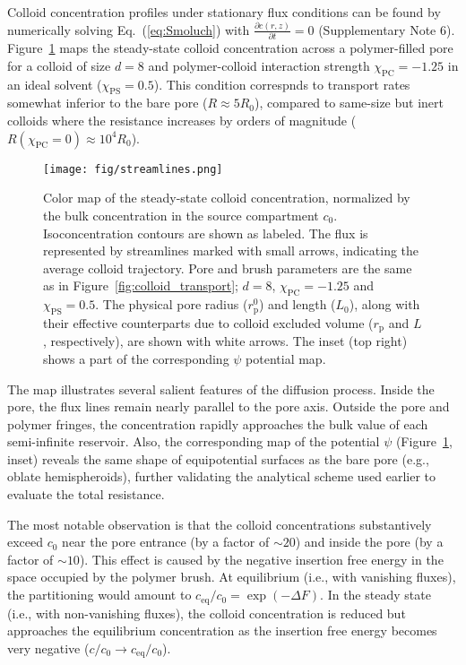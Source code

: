 \documentclass[12pt, a4paper]{article}
\begin{document}
Colloid concentration profiles under stationary flux conditions can be found by numerically solving Eq.~(\ref{eq:Smoluch}) with $\frac{\partial c(r,z)}{\partial t} = 0$ (Supplementary Note 6).
Figure~\ref{fig:colloid_concentration} maps the steady-state colloid concentration across a polymer-filled pore for a colloid of size $d = 8$ and polymer-colloid interaction strength $\chi_{\text{PC}} = -1.25$ in an ideal solvent ($\chi_{\text{PS}} = 0.5$).
This condition correspnds to transport rates somewhat inferior to the bare pore ($R \approx 5 R_0$), compared to same-size but inert colloids where the resistance increases by orders of magnitude ($R(\chi_\text{PC}=0) \approx 10^4 R_0$).

\begin{figure}
    \centering
    \centerline{\texttt{[image: fig/streamlines.png]}}
    \caption{
    Color map of the steady-state colloid concentration, normalized by the bulk concentration in the source compartment $c_0$.
    Isoconcentration contours are shown as labeled.
    The flux is represented by streamlines marked with small arrows, indicating the average colloid trajectory.
    Pore and brush parameters are the same as in Figure~\ref{fig:colloid_transport}; $d = 8$, $\chi_{\text{PC}} = -1.25$ and $\chi_{\text{PS}} = 0.5$.
    The physical pore radius ($r_\text{p}^0$) and length ($L_0$), along with their effective counterparts due to colloid excluded volume ($r_\text{p}$ and $L$, respectively), are shown with white arrows.
    The inset (top right) shows a part of the corresponding $\psi$ potential map.
    }
    \label{fig:colloid_concentration}
\end{figure}

The map illustrates several salient features of the diffusion process.
Inside the pore, the flux lines remain nearly parallel to the pore axis.
Outside the pore and polymer fringes, the concentration rapidly approaches the bulk value of each semi-infinite reservoir.
Also, the corresponding map of the potential $\psi$ (Figure~\ref{fig:colloid_concentration}, inset) reveals the same shape of equipotential surfaces as the bare pore (e.g., oblate hemispheroids), further validating the analytical scheme used earlier to evaluate the total resistance.

The most notable observation is that the colloid concentrations substantively exceed $c_0$ near the pore entrance (by a factor of $\sim20$) and inside the pore (by a factor  of $\sim10$).
This effect is caused by the negative insertion free energy in the space occupied by the polymer brush.
At equilibrium (i.e., with vanishing fluxes), the partitioning would amount to $c_{\text{eq}}/c_0 = \exp\left( -\Delta F \right)$.
In the steady state (i.e., with non-vanishing fluxes), the colloid concentration is reduced but approaches the equilibrium concentration as the insertion free energy becomes very negative ($c/c_0 \to c_{\text{eq}}/c_0$).
\end{document}

